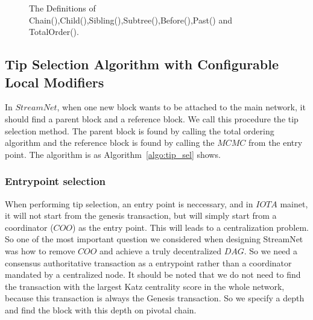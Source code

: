 

\begin{figure}
\begin{equation*}
\end{equation*}
\label{totalFormulas}
\caption{ The Definitions of Chain(),Child(),Sibling(),Subtree(),Before(),Past() and TotalOrder(). }
\end{figure}



\subsection{Tip Selection Algorithm with Configurable Local Modifiers}

In $StreamNet$, when one new block wants to be attached to the main network, it should find a parent block and a reference block. We call this procedure the tip selection method. 
The parent block is found by calling the total ordering algorithm and the reference block is found by calling the $MCMC$ from the entry point. The algorithm is as Algorithm~\ref{algo:tip_sel} shows.



\subsubsection{Entrypoint selection}
When performing tip selection, an entry point is neccessary, and in $IOTA$ mainet, it will not start from the genesis transaction,
but will simply start from a coordinator ($COO$) as the entry point.
This will leads to a centralization problem. 
So one of the most important question we considered when designing StreamNet was how to remove $COO$ and achieve a truly decentralized $DAG$. 
So we need a consensus authoritative transaction as a entrypoint rather than a coordinator mandated by a centralized node.
It should be noted that we do not need to find the transaction with the largest Katz centrality score in the whole network,
because this transaction is always the Genesis transaction.
So we specify a depth and find the block with this depth on pivotal chain.

